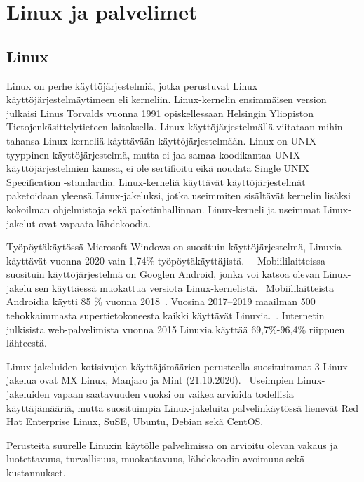 \chapter{Linux ja palvelimet}\label{linux_ja_palvelimet}

\section{Linux}\label{linux}

Linux on perhe käyttöjärjestelmiä, jotka perustuvat Linux käyttöjärjestelmäytimeen eli kerneliin. Linux-kernelin ensimmäisen version julkaisi Linus Torvalds vuonna 1991 opiskellessaan Helsingin Yliopiston Tietojenkäsittelytieteen laitoksella. Linux-käyttöjärjestelmällä viitataan mihin tahansa Linux-kerneliä käyttävään käyttöjärjestelmään. Linux on UNIX-tyyppinen käyttöjärjestelmä, mutta ei jaa samaa koodikantaa UNIX-käyttöjärjestelmien kanssa, ei ole sertifioitu eikä noudata Single UNIX Specification -standardia. Linux-kerneliä käyttävät käyttöjärjestelmät paketoidaan yleensä Linux-jakeluksi, jotka useimmiten sisältävät kernelin lisäksi kokoilman ohjelmistoja sekä paketinhallinnan. Linux-kerneli ja useimmat Linux-jakelut ovat vapaata lähdekoodia.~\cite{openbookos}~\cite{mediumlinux}

Työpöytäkäytössä Microsoft Windows on suosituin käyttöjärjestelmä, Linuxia käyttävät vuonna 2020 vain 1,74\% työpöytäkäyttäjistä.~\cite{statcounter}~ Mobiililaitteissa suosituin käyttöjärjestelmä on Googlen Android, jonka voi katsoa olevan Linux-jakelu sen käyttäessä muokattua versiota Linux-kernelistä.~\cite{itworld} Mobiililaitteista Androidia käytti 85 \% vuonna 2018~\cite{cnet}. Vuosina 2017–2019 maailman 500 tehokkaimmasta supertietokoneesta kaikki käyttävät Linuxia.~\cite{itsfoss}. Internetin julkisista web-palvelimista vuonna 2015 Linuxia käyttää 69,7\%-96,4\% riippuen lähteestä.~\cite{w3techs}~\cite{w3cook}

Linux-jakeluiden kotisivujen käyttäjämäärien perusteella suosituimmat 3 Linux-jakelua ovat MX Linux, Manjaro ja Mint (21.10.2020).~\cite{distrowatch} Useimpien Linux-jakeluiden vapaan saatavuuden vuoksi on vaikea arvioida todellisia käyttäjämääriä, mutta suosituimpia Linux-jakeluita palvelinkäytössä lienevät Red Hat Enterprise Linux, SuSE, Ubuntu, Debian sekä CentOS.~\cite{linuxcom}

Perusteita suurelle Linuxin käytölle palvelimissa on arvioitu olevan vakaus ja luotettavuus, turvallisuus, muokattavuus, lähdekoodin avoimuus sekä kustannukset.~\cite{tecmint}

